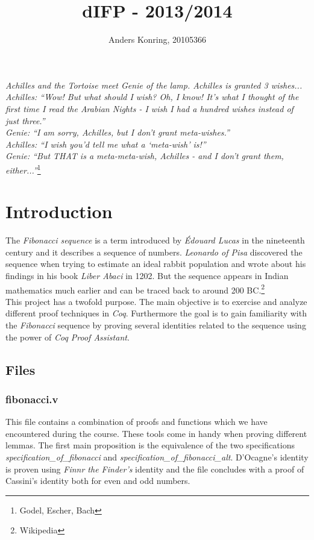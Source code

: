 \documentclass[9pt,a4paper,oneside]{article}
\title{dIFP - 2013/2014}
\author{Anders Konring, 20105366}
\begin{document}
\maketitle

\noindent\textit{Achilles and the Tortoise meet Genie of the lamp. Achilles is granted 3 wishes...}\\
\textit{Achilles: “Wow! But what should I wish? Oh, I know! It’s what I thought of the first time I read the Arabian Nights - I wish I had a hundred wishes instead of just three.”}\\
\textit{Genie: “I am sorry, Achilles, but I don’t grant meta-wishes.''}\\
\textit{Achilles: “I wish you’d tell me what a ‘meta-wish’ is!”}\\
\textit{Genie: “But THAT is a meta-meta-wish, Achilles - and I don’t grant them, either...''}\footnote{Godel, Escher, Bach}


\section{Introduction}
The \textit{Fibonacci sequence} is a term introduced by \textit{Édouard Lucas} in the nineteenth century and it describes a sequence of numbers. \textit{Leonardo of Pisa} discovered the sequence when trying to estimate an ideal rabbit population and wrote about his findings in his book \textit{Liber Abaci} in 1202. But the sequence appears in Indian mathematics much earlier and can be traced back to around 200 BC.\footnote{Wikipedia} \\

This project has a twofold purpose. The main objective is to exercise and analyze different proof techniques in \textit{Coq}. Furthermore the goal is to gain familiarity with the \textit{Fibonacci} sequence by proving several identities related to the sequence using the power of \textit{Coq Proof Assistant}.

\subsection{Files}
\subsubsection{fibonacci.v}
This file contains a combination of proofs and functions which we have encountered during the course. These tools come in handy when proving different lemmas. The first main proposition is the equivalence of the two specifications \textit{specification\_of\_fibonacci} and \textit{specification\_of\_fibonacci\_alt}. D’Ocagne’s identity is proven using \textit{Finnr the Finder’s} identity and the file concludes with a proof of Cassini’s identity both for even and odd numbers.
\end{document}
